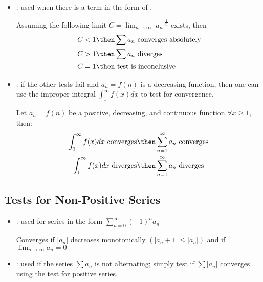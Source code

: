 \begin{itemize}
  \item {}: used when there is a term in the form of
    .

    Assuming the following limit \(C = \lim_{n \to \infty}
    |a_n|^{\frac{1}{n}} \) exists, then
    \begin{align*}
      C &< 1 \then \sum a_n ~\text{converges absolutely} \\
      C &> 1 \then \sum a_n ~\text{diverges} \\
      C &= 1 \then ~\text{test is inconclusive}~
    \end{align*}

  \item {}: if the other tests fail and \(a_n = f(n)\) is
    a decreasing function, then one can use the improper integral
    \(\int_1^\infty f(x)dx\) to test for convergence.

    Let \(a_n = f(n)\) be a positive, decreasing, and continuous function
    \(\forall x \geq 1\), then:
    \begin{align*}
      \int_1^\infty f(x)dx ~\text{converges} &\then \sum_{n=1}^{\infty}
      a_n ~\text{converges}\\
      \int_1^\infty f(x)dx ~\text{diverges} &\then \sum_{n=1}^{\infty}
      a_n ~\text{diverges}
    \end{align*}
\end{itemize}

\subsection{Tests for Non-Positive Series}
\vspace{-8pt}
  \begin{itemize}
    \item {}: used for series in the form
      \(%
      \displaystyle  \sum_{n=0}^{\infty} (-1)^n a_n
      \)%

      Converges if \(|a_n|\) decreases monotonically \(\left(|a_n+1| \leq |a_n|\right)\)
      and if \(\lim_{n \to \infty} a_n = 0\)

      \vspace{16pt}

    \item {}: used if the series \(\sum a_n\) is not
      alternating; simply test if \(\sum |a_n| \) converges using the test
      for positive series.

  \end{itemize}


